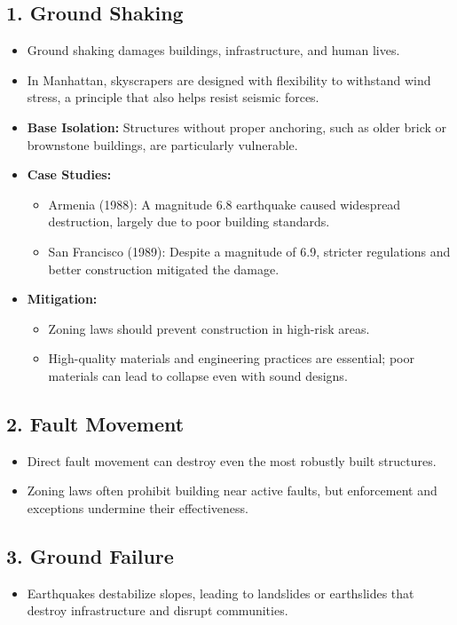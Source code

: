 \documentclass[12pt]{article}
\begin{document}
\subsection*{1. Ground Shaking}
\begin{itemize}
    \item Ground shaking damages buildings, infrastructure, and human lives.
    \item In Manhattan, skyscrapers are designed with flexibility to withstand wind stress, a principle that also helps resist seismic forces.
    \item \textbf{Base Isolation:} Structures without proper anchoring, such as older brick or brownstone buildings, are particularly vulnerable.
    \item \textbf{Case Studies:}
    \begin{itemize}
        \item Armenia (1988): A magnitude 6.8 earthquake caused widespread destruction, largely due to poor building standards.
        \item San Francisco (1989): Despite a magnitude of 6.9, stricter regulations and better construction mitigated the damage.
    \end{itemize}
    \item \textbf{Mitigation:}
    \begin{itemize}
        \item Zoning laws should prevent construction in high-risk areas.
        \item High-quality materials and engineering practices are essential; poor materials can lead to collapse even with sound designs.
    \end{itemize}
\end{itemize}

\subsection*{2. Fault Movement}
\begin{itemize}
    \item Direct fault movement can destroy even the most robustly built structures.
    \item Zoning laws often prohibit building near active faults, but enforcement and exceptions undermine their effectiveness.
\end{itemize}

\subsection*{3. Ground Failure}
\begin{itemize}
    \item Earthquakes destabilize slopes, leading to landslides or earthslides that destroy infrastructure and disrupt communities.
\end{itemize}
\end{document}
